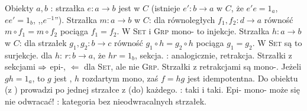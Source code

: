 Obiekty  $a, b$ : strzałka $e \colon a \to b$ jest  w $C$  (istnieje $e' \colon b \to a$ w $C$, że $e'e = 1_a$, $ee' = 1_b$, ,,$e^{-1}$''). 
Strzałka $m \colon a \to b$  w $C$: dla równoległych $f_1, f_2 \colon d \to a$ równość $m \circ f_1 = m \circ f_2$ pociąga $f_1 = f_2$.
W \textsc{Set} i \textsc{Grp} mono- to injekcje.
Strzałka $h \colon a \to b$  w $C$: dla strzałek $g_1, g_2 \colon b \to c$ równość $g_1 \circ h = g_2 \circ h$ pociąga $g_1 = g_2$.
W \textsc{Set} są to surjekcje.
 dla $h$: $r \colon b \to a$, że $hr = 1_b$, sekcja.
: analogicznie, retrakcja.
Strzałki z sekcjami $\Rightarrow$ epi-, $\Leftarrow$ dla \textsc{Set}, ale nie \textsc{Grp}.
Strzałki z retrakcjami są mono-.
Jeżeli $gh=1_a$, to $g$ jest , $h$ rozdartym mono, zaś $f=hg$ jest idempotentna.
Do obiektu  (z ) prowadzi po jednej strzałce z (do) każdego.
: taki i taki.
Epi- mono- może się nie odwracać!
: kategoria bez nieodwracalnych strzałek.